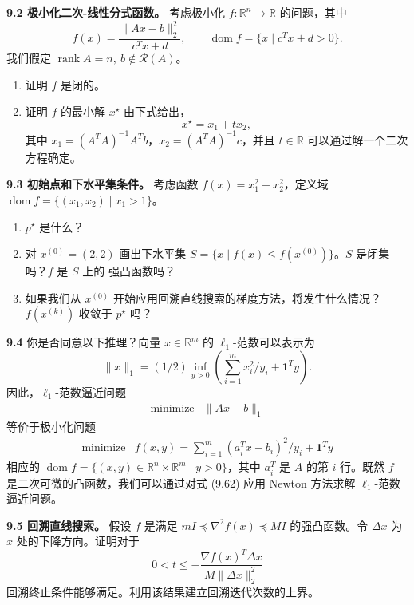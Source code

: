 \documentclass[UTF8, 12pt, fontset=fandol, oneside]{ctexart}
\begin{document}
\noindent\textbf{9.2 极小化二次-线性分式函数。}\quad
考虑极小化 $f:\mathbb{R}^n\to\mathbb{R}$ 的问题，其中
\[
f(x)=\frac{\|Ax-b\|_2^2}{c^Tx+d},\qquad
\operatorname{dom} f=\{x\mid c^Tx+d>0\}.
\]
我们假定 $\operatorname{rank} A=n,\ b\notin\mathcal{R}(A)$。
\begin{enumerate}
\item[(a)] 证明 $f$ 是闭的。
\item[(b)] 证明 $f$ 的最小解 $x^\star$ 由下式给出，
\[
x^\star=x_1+tx_2,
\]
其中 $x_1=(A^TA)^{-1}A^Tb$，$x_2=(A^TA)^{-1}c$，并且 $t\in\mathbb{R}$ 可以通过解一个二次方程确定。
\end{enumerate}

\noindent\textbf{9.3 初始点和下水平集条件。}\quad
考虑函数 $f(x)=x_1^2+x_2^2$，定义域 $\operatorname{dom} f=\{(x_1,x_2)\mid x_1>1\}$。
\begin{enumerate}
\item[(a)] $p^\star$ 是什么？
\item[(b)] 对 $x^{(0)}=(2,2)$ 画出下水平集 $S=\{x\mid f(x)\leq f(x^{(0)})\}$。$S$ 是闭集吗？$f$ 是 $S$ 上的
强凸函数吗？
\item[(c)] 如果我们从 $x^{(0)}$ 开始应用回溯直线搜索的梯度方法，将发生什么情况？$f(x^{(k)})$ 收敛于 $p^\star$ 吗？
\end{enumerate}

\noindent\textbf{9.4}\quad
你是否同意以下推理？向量 $x\in\mathbb{R}^m$ 的 $\ell_1$-范数可以表示为
\[
\|x\|_1=(1/2)\inf_{y>0}\left(\sum_{i=1}^m x_i^2/y_i+\mathbf{1}^Ty\right).
\]
因此，$\ell_1$-范数逼近问题
\[
\begin{array}{ll}
\mbox{minimize} & \|Ax-b\|_1
\end{array}
\]
等价于极小化问题
\begin{equation}
\begin{array}{ll}
\mbox{minimize} & f(x,y)=\sum_{i=1}^m(a_i^Tx-b_i)^2/y_i+\mathbf{1}^Ty
\end{array}
\tag{9.62}
\end{equation}
相应的 $\operatorname{dom} f=\{(x,y)\in\mathbb{R}^n\times\mathbb{R}^m\mid y>0\}$，其中 $a_i^T$ 是 $A$ 的第 $i$ 行。既然 $f$ 是二次可微的凸函数，我们可以通过对式 (9.62) 应用 Newton 方法求解 $\ell_1$-范数逼近问题。

\noindent\textbf{9.5 回溯直线搜索。}\quad
假设 $f$ 是满足 $mI\preceq\nabla^2 f(x)\preceq MI$ 的强凸函数。令 $\Delta x$ 为 $x$ 处的下降方向。证明对于
\[
0<t\leq -\frac{\nabla f(x)^T\Delta x}{M\|\Delta x\|_2^2}
\]
回溯终止条件能够满足。利用该结果建立回溯迭代次数的上界。
\end{document}
